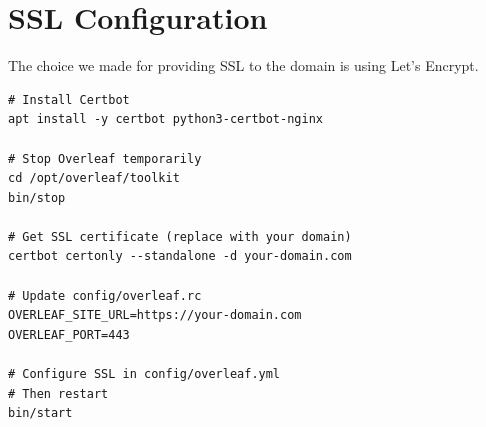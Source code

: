 

\section{SSL Configuration}

The choice we made for providing SSL to the domain is using Let's Encrypt.
\begin{verbatim}
# Install Certbot
apt install -y certbot python3-certbot-nginx

# Stop Overleaf temporarily
cd /opt/overleaf/toolkit
bin/stop

# Get SSL certificate (replace with your domain)
certbot certonly --standalone -d your-domain.com

# Update config/overleaf.rc
OVERLEAF_SITE_URL=https://your-domain.com
OVERLEAF_PORT=443

# Configure SSL in config/overleaf.yml
# Then restart
bin/start
\end{verbatim}

